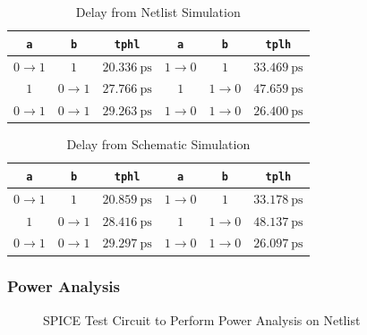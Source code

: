 \documentclass{article}
\begin{document}
	\begin{table}[H]
	\begin{center}
	\caption{Delay from Netlist Simulation}
	\label{table::nand_gate_delay_analysis}
	\begin{tabular}{| c | c | c || c | c | c |}
		\hline
		\texttt{a} & \texttt{b} & \texttt{tphl} & \texttt{a} & \texttt{b} & \texttt{tplh} \\
		\hline	
		$0 \rightarrow 1$ & $1$ & $20.336\ \text{ps}$ & $1 \rightarrow 0$ & $1$ & $33.469\ \text{ps}$\\
		\hline	
		$1$ & $0 \rightarrow 1$ & $27.766\ \text{ps}$ & $1$ & $1 \rightarrow 0$ & $47.659\ \text{ps}$\\
		\hline	
		$0 \rightarrow 1$ & $0 \rightarrow 1$ & $29.263\ \text{ps}$ & $1 \rightarrow 0$ & $1 \rightarrow 0$ & $26.400\ \text{ps}$\\
		\hline
	\end{tabular}
	\end{center}
	\end{table}
	
	\begin{table}[H]
	\begin{center}
	\caption{Delay from Schematic Simulation}
	\label{table::nand_gate_delay_analysis_schem}
	\begin{tabular}{| c | c | c || c | c | c |}
		\hline
		\texttt{a} & \texttt{b} & \texttt{tphl} & \texttt{a} & \texttt{b} & \texttt{tplh} \\
		\hline	
		$0 \rightarrow 1$ & $1$ & $20.859\ \text{ps}$ & $1 \rightarrow 0$ & $1$ & $33.178\ \text{ps}$\\
		\hline	
		$1$ & $0 \rightarrow 1$ & $28.416\ \text{ps}$ & $1$ & $1 \rightarrow 0$ & $48.137\ \text{ps}$\\
		\hline	
		$0 \rightarrow 1$ & $0 \rightarrow 1$ & $29.297\ \text{ps}$ & $1 \rightarrow 0$ & $1 \rightarrow 0$ & $26.097\ \text{ps}$\\
		\hline
	\end{tabular}
	\end{center}
	\end{table}
	
	\subsubsection{Power Analysis}
	\begin{figure}[H]
		
		\caption{SPICE Test Circuit to Perform Power Analysis on Netlist}
		\label{fig::nand_power_analysis_test_circuit}
	\end{figure}
	
\end{document}
